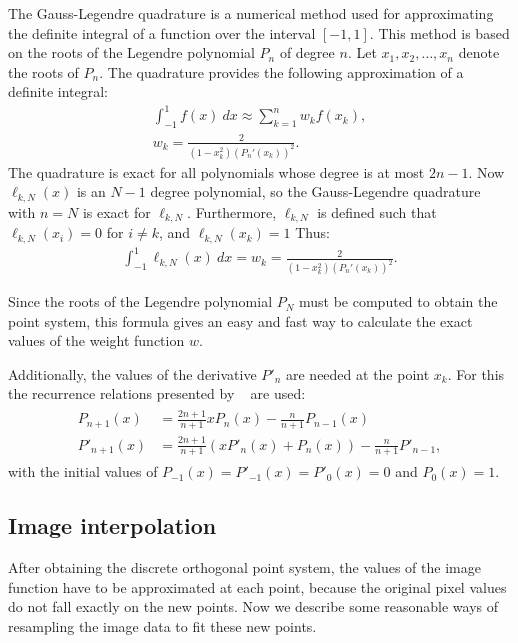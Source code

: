 The Gauss-Legendre quadrature is a numerical method used for approximating the definite integral of a function over the interval $[-1,1]$. This method is based on the roots of the Legendre polynomial $P_n$ of degree $n$. Let $x_1,x_2,\ldots,x_n$ denote the roots of $P_n$. The quadrature provides the following approximation of a definite integral:
\begin{gather*}
    \int_{-1}^{1}f(x)\ dx \approx \sum_{k=1}^n w_k f(x_k), \\
    w_k = \frac{2}{(1-x_k^2)(P_n'(x_k))^2}.
\end{gather*}
The quadrature is exact for all polynomials whose degree is at most $2n-1$. Now $\ell_{k,N}(x)$ is an $N-1$ degree polynomial, so the Gauss-Legendre quadrature with $n=N$ is exact for $\ell_{k,N}$. Furthermore, $\ell_{k,N}$ is defined such that $\ell_{k,N}(x_i) = 0$ for $i \neq k$, and $\ell_{k,N}(x_k) = 1$ Thus:
\begin{gather*}
    \int_{-1}^{1}\ell_{k,N}(x)\ dx = w_k = \frac{2}{(1-x_k^2)(P_n'(x_k))^2}.
\end{gather*}

Since the roots of the Legendre polynomial $P_N$ must be computed to obtain the point system, this formula gives an easy and fast way to calculate the exact values of the weight function $w$.


Additionally, the values of the derivative $P'_n$ are needed at the point $x_k$. For this the recurrence relations presented by \citeauthor{legendre_algo}~\cite{legendre_algo} are used:
\begin{gather*}
    \begin{split}
        P_{n+1}(x) &= \frac{2n + 1}{n + 1}xP_n(x) - \frac{n}{n + 1}P_{n-1}(x)\\
        P'_{n+1}(x) &= \frac{2n + 1}{n + 1}(xP'_n(x) + P_n(x)) - \frac{n}{n+1}P'_{n-1},
    \end{split}
\end{gather*}
with the initial values of $P_{-1}(x) = P'_{-1}(x) = P'_0(x) = 0$ and $P_0(x) = 1$.

\subsection{Image interpolation}
After obtaining the discrete orthogonal point system, the values of the image function have to be approximated at each point, because the original pixel values do not fall exactly on the new points. Now we describe some reasonable ways of resampling the image data to fit these new points.

